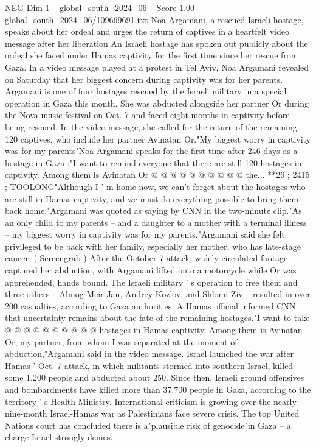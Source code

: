 \begin{textsample}{NEG Dim 1 – global\_south\_2024\_06 – Score 1.00 – global\_south\_2024\_06/109669691.txt}  \label{ex:f1_neg_317}
Noa Argamani, a rescued Israeli hostage, speaks about her ordeal and urges the return of captives in a heartfelt video message after her liberation An Israeli hostage has spoken out publicly about the ordeal she faced under Hamas captivity for the first time since her rescue from Gaza.
In a video message played at a protest in Tel Aviv, Noa Argamani revealed on Saturday that her biggest concern during captivity was for her parents.
Argamani is one of four hostages rescued by the Israeli military in a special operation in Gaza this month.
She was abducted alongside her partner Or during the Nova music festival on Oct. 7 and faced eight months in captivity before being rescued.
In the video message, she called for the return of the remaining 120 captives, who include her partner Avinatan Or."My biggest worry in captivity was for my parents"Noa Argamani speaks for the first time after 246 days as a hostage in Gaza :"I want to remind everyone that there are still 120 hostages in captivity.
Among them is Avinatan Or @ @ @ @ @ @ @ @ @ @ the... **26 ; 2415 ; TOOLONG"Although I ' m home now, we can't forget about the hostages who are still in Hamas captivity, and we must do everything possible to bring them back home,"Argamani was quoted as saying by CNN in the two-minute clip."As an only child to my parents -- and a daughter to a mother with a terminal illness -- my biggest worry in captivity was for my parents."Argamani said she felt privileged to be back with her family, especially her mother, who has late-stage cancer. ( Screengrab ) After the October 7 attack, widely circulated footage captured her abduction, with Argamani lifted onto a motorcycle while Or was apprehended, hands bound.
The Israeli military ' s operation to free them and three others -- Almog Meir Jan, Andrey Kozlov, and Shlomi Ziv -- resulted in over 200 casualties, according to Gaza authorities.
A Hamas official informed CNN that uncertainty remains about the fate of the remaining hostages."I want to take @ @ @ @ @ @ @ @ @ @ hostages in Hamas captivity.
Among them is Avinatan Or, my partner, from whom I was separated at the moment of abduction,"Argamani said in the video message.
Israel launched the war after Hamas ' Oct. 7 attack, in which militants stormed into southern Israel, killed some 1,200 people and abducted about 250.
Since then, Israeli ground offensives and bombardments have killed more than 37,700 people in Gaza, according to the territory ' s Health Ministry.
International criticism is growing over the nearly nine-month Israel-Hamas war as Palestinians face severe crisis.
The top United Nations court has concluded there is a"plausible risk of genocide"in Gaza -- a charge Israel strongly denies.

\end{textsample}
